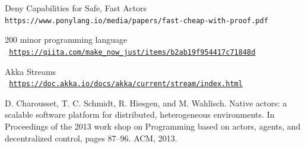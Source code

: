 \documentclass{article}
\begin{document}
\begin{multicols}{2}
\begin{thebibliography}{9}
Deny Capabilities for Safe, Fast Actors
\\\texttt{https://www.ponylang.io/media/papers/fast-cheap-with-proof.pdf}	

200 minor programming language
\\\texttt{ \url{https://qiita.com/make_now_just/items/b2ab19f954417c71848d} }

Akka Streams
\\\texttt{ \url{https://doc.akka.io/docs/akka/current/stream/index.html} }

D. Charousset, T. C. Schmidt, R. Hiesgen, and M. Wahlisch. Native actors: a scalable software platform for distributed, heterogeneous environments. In Proceedings of the 2013 work shop on Programming based on actors, agents, and decentralized control, pages 87–96. ACM, 2013.

\end{thebibliography}
\end{multicols}
\end{document}
